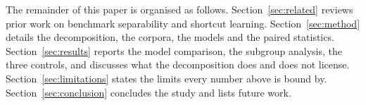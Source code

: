 The remainder of this paper is organised as follows. Section~\ref{sec:related} reviews prior work on benchmark separability and shortcut learning. Section~\ref{sec:method} details the decomposition, the corpora, the models and the paired statistics. Section~\ref{sec:results} reports the model comparison, the subgroup analysis, the three controls, and discusses what the decomposition does and does not license. Section~\ref{sec:limitations} states the limits every number above is bound by. Section~\ref{sec:conclusion} concludes the study and lists future work.
